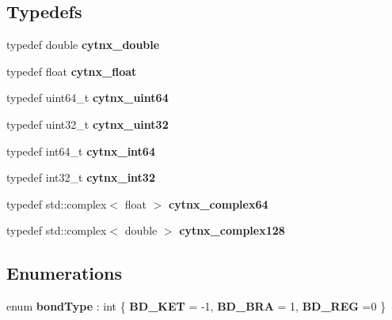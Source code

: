 \subsection*{Typedefs}
\begin{DoxyCompactItemize}
\item 
\mbox{\label{namespacecytnx_a17b847d265f6551b952fd9847198a464}} 
typedef double {\bfseries cytnx\+\_\+double}
\item 
\mbox{\label{namespacecytnx_a456fea0ea7baaa151496b24424829253}} 
typedef float {\bfseries cytnx\+\_\+float}
\item 
\mbox{\label{namespacecytnx_a9a7ab808c7cbef775461ccc31eaabeb4}} 
typedef uint64\+\_\+t {\bfseries cytnx\+\_\+uint64}
\item 
\mbox{\label{namespacecytnx_a335d8fee19dee02206dbecec6e5ec610}} 
typedef uint32\+\_\+t {\bfseries cytnx\+\_\+uint32}
\item 
\mbox{\label{namespacecytnx_aa7b7ff4d6d244994d35853a6ce547587}} 
typedef int64\+\_\+t {\bfseries cytnx\+\_\+int64}
\item 
\mbox{\label{namespacecytnx_a6504b8a7b459f70c0a24d4ea2893a976}} 
typedef int32\+\_\+t {\bfseries cytnx\+\_\+int32}
\item 
\mbox{\label{namespacecytnx_a63d2515ecaa35660c85571236e61fec7}} 
typedef std\+::complex$<$ float $>$ {\bfseries cytnx\+\_\+complex64}
\item 
\mbox{\label{namespacecytnx_a401ce1c8c4599b9a1a860e9e225e6b9e}} 
typedef std\+::complex$<$ double $>$ {\bfseries cytnx\+\_\+complex128}
\end{DoxyCompactItemize}
\subsection*{Enumerations}
\begin{DoxyCompactItemize}
\item 
\mbox{\label{namespacecytnx_ac1ea381505268a3cf3bc68d7b8a480ef}} 
enum {\bfseries bond\+Type} \+: int \{ {\bfseries B\+D\+\_\+\+K\+ET} = -\/1, 
{\bfseries B\+D\+\_\+\+B\+RA} = 1, 
{\bfseries B\+D\+\_\+\+R\+EG} =0
 \}
\end{DoxyCompactItemize}
